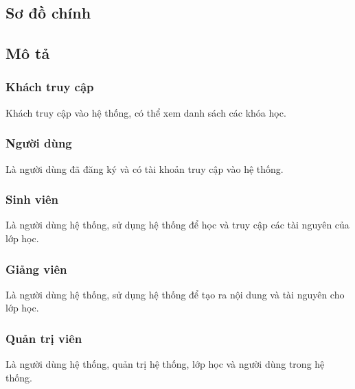 \documentclass[./../main_file.tex]{subfiles}
\begin{document}
\subsection{Sơ đồ chính}
\subsection{Mô tả}
	\subsubsection{Khách truy cập}
	Khách truy cập vào hệ thống, có thể xem danh sách các khóa học.
	
	\subsubsection{Người dùng}
	Là người dùng đã đăng ký và có tài khoản truy cập vào hệ thống.
	
	\subsubsection{Sinh viên}
	Là người dùng hệ thống, sử dụng hệ thống để học và truy cập các tài nguyên của lớp học.
	
	\subsubsection{Giảng viên}
	Là người dùng hệ thống, sử dụng hệ thống để tạo ra nội dung và tài nguyên cho lớp học.
	
	\subsubsection{Quản trị viên}
	Là người dùng hệ thống, quản trị hệ thống, lớp học và người dùng trong hệ thống.
	
	
\end{document}
